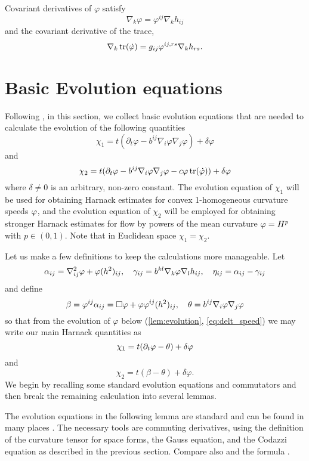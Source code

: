 \documentclass{amsart}
\begin{document}
Covariant derivatives of \(\varphi\) satisfy
\begin{equation}
\label{eq:delphi}
\nabla_k \varphi = \varphi^{ij} \nabla_k h_{ij}
\end{equation}
and the covariant derivative of the trace,
\begin{equation}
\label{eq:delPhi}
\nabla_k \operatorname{tr}(\dot{\varphi}) = g_{ij} \varphi^{ij,rs} \nabla_k h_{rs}.
\end{equation}

\section{Basic Evolution equations}

Following \cite{MR1296393, MR1100812, MR1316556, MR1480081}, in this section, we collect basic evolution equations that are needed to calculate the evolution of the following quantities
\[
\chi_1 =t(\partial_t \varphi- b^{ij} \nabla_i \varphi \nabla_j \varphi) +\delta\varphi
\]
and
\[
\chi_2 =t(\partial_t \varphi - b^{ij} \nabla_i \varphi \nabla_j \varphi - c \varphi \operatorname{tr}(\dot{\varphi})) +\delta\varphi
\]
where \(\delta \ne 0\) is an arbitrary, non-zero constant. The evolution equation of $\chi_1$ will be used for obtaining Harnack estimates for convex 1-homogeneous curvature speeds $\varphi$, and the evolution equation of $\chi_2$ will be employed for obtaining stronger Harnack estimates for flow by powers of the mean curvature $\varphi=H^{p}$ with $p\in(0,1).$ Note that in Euclidean space $\chi_1=\chi_2.$

Let us make a few definitions to keep the calculations more manageable. Let
\[
\alpha_{ij} = \nabla^2_{ij} \varphi + \varphi(h^2)_{ij}, \quad \gamma_{ij} = b^{kl} \nabla_k \varphi \nabla_l h_{ij}, \quad \eta_{ij} = \alpha_{ij} - \gamma_{ij}
\]
and define
\[
\beta = \varphi^{ij} \alpha_{ij} = \Box\varphi + \varphi \varphi^{ij}(h^2)_{ij}, \quad \theta =  b^{ij} \nabla_i \varphi \nabla_j \varphi
\]
so that from the evolution of \(\varphi\) below (\cref{lem:evolution}, \cref{eq:delt_speed}) we may write our main Harnack quantities as
\[
\chi_1 = t(\partial_t\varphi- \theta) + \delta\varphi
\]
and
\[
\chi_2 = t(\beta - \theta) + \delta\varphi.
\]
We begin by recalling some standard evolution equations and commutators and then break the remaining calculation into several lemmas.

The evolution equations in the following lemma are standard and can be found in many places \cite{MR1296393, MR1100812, MR1316556, MR892052, MR1480081}. The necessary tools are commuting derivatives, using the definition of the curvature tensor for space forms, the Gauss equation, and the Codazzi equation as described in the previous section. Compare also \cite[p.~94-95]{Gerhardt:/2006} and the formula \cite[eq.~(6.17)]{Gerhardt:01/1996}.
\end{document}
